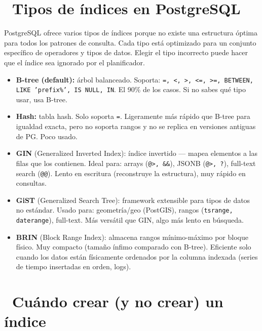 \section[Tipos de índices en PostgreSQL]{~Tipos de índices en PostgreSQL}

PostgreSQL ofrece varios tipos de índices porque no existe una estructura óptima para todos los patrones de consulta.
Cada tipo está optimizado para un conjunto específico de operadores y tipos de datos.
Elegir el tipo incorrecto puede hacer que el índice sea ignorado por el planificador.

\begin{itemize}
  \item \textbf{B-tree (default):} árbol balanceado. Soporta: \texttt{=, <, >, <=, >=, BETWEEN, LIKE 'prefix\%', IS NULL, IN}.
    El 90\% de los casos. Si no sabes qué tipo usar, usa B-tree.

  \item \textbf{Hash:} tabla hash. Solo soporta \texttt{=}. Ligeramente más rápido que B-tree para igualdad exacta, pero no soporta rangos y no se replica en versiones antiguas de PG. Poco usado.

  \item \textbf{GIN} (Generalized Inverted Index): índice invertido — mapea elementos a las filas que los contienen.
    Ideal para: arrays (\texttt{@>, \&\&}), JSONB (\texttt{@>, ?}), full-text search (\texttt{@@}).
    Lento en escritura (reconstruye la estructura), muy rápido en consultas.

  \item \textbf{GiST} (Generalized Search Tree): framework extensible para tipos de datos no estándar.
    Usado para: geometría/geo (PostGIS), rangos (\texttt{tsrange, daterange}), full-text.
    Más versátil que GIN, algo más lento en búsqueda.

  \item \textbf{BRIN} (Block Range Index): almacena rangos mínimo-máximo por bloque físico.
    Muy compacto (tamaño ínfimo comparado con B-tree). Eficiente solo cuando los datos están físicamente ordenados por la columna indexada (series de tiempo insertadas en orden, logs).
\end{itemize}

\section[Cuándo crear (y no crear) un índice]{~Cuándo crear (y no crear) un índice}

